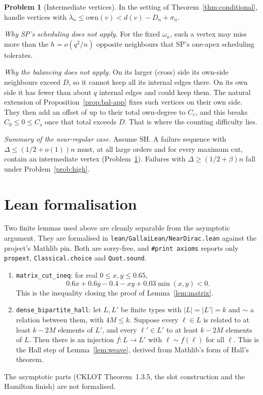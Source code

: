\documentclass[11pt]{article}
\theoremstyle{definition}
\newtheorem{problem}[theorem]{Problem}
\newcommand{\own}{\mathrm{own}}
\begin{document}
\begin{problem}[Intermediate vertices]\label{prob:intermediate}
In the setting of Theorem~\ref{thm:conditional}, handle vertices with $\lambda_n\le\own(v)<d(v)-D_n+\sigma_n$.

\emph{Why SP's scheduling does not apply.} For the fixed $\omega_n$, such a vertex may miss more than the $h=o(q^2/n)$ opposite neighbours that SP's one-apex scheduling tolerates.

\emph{Why the balancing does not apply.} On its larger (cross) side its own-side neighbours exceed $D$, so it cannot keep all its internal edges there. On its own side it has fewer than about $q$ internal edges and could keep them. The natural extension of Proposition~\ref{prop:bal-app} fixes such vertices on their own side. They then add an offset of up to their total own-degree to $C_r$, and this breaks $C_0\le0\le C_s$ once that total exceeds $D$. That is where the counting difficulty lies.
\end{problem}

\noindent\emph{Summary of the near-regular case.} Assume SH. A failure sequence with $\Delta\le(1/2+o(1))n$ must, at all large orders and for every maximum cut, contain an intermediate vertex (Problem~\ref{prob:intermediate}). Failures with $\Delta\ge(1/2+\beta)n$ fall under Problem~\ref{prob:high}.

\section{Lean formalisation}\label{sec:lean}

Two finite lemmas used above are cleanly separable from the asymptotic argument. They are formalised in \texttt{lean/GallaiLean/NearDirac.lean} against the project's Mathlib pin. Both are sorry-free, and \texttt{\#print axioms} reports only \texttt{propext}, \texttt{Classical.choice} and \texttt{Quot.sound}.
\begin{enumerate}[label=(\arabic*)]
\item \texttt{matrix\_cut\_ineq}: for real $0\le x,y\le0.65$,
\[
0.6x+0.6y-0.4-xy+0.03\min(x,y)<0 .
\]
This is the inequality closing the proof of Lemma~\ref{lem:matrix}.
\item \texttt{dense\_bipartite\_hall}: let $L,L'$ be finite types with $|L|=|L'|=k$ and $\sim$ a relation between them, with $4M\le k$. Suppose every $\ell\in L$ is related to at least $k-2M$ elements of $L'$, and every $\ell'\in L'$ to at least $k-2M$ elements of $L$. Then there is an injection $f:L\to L'$ with $\ell\sim f(\ell)$ for all $\ell$. This is the Hall step of Lemma~\ref{lem:weave}, derived from Mathlib's form of Hall's theorem.
\end{enumerate}
The asymptotic parts (CKLOT Theorem~1.3.5, the slot construction and the Hamilton finish) are not formalised.
\end{document}
